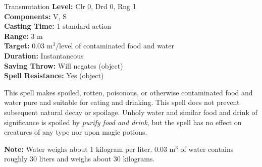 {Transmutation}
{
	\textbf{Level:}
	Clr 0, Drd 0, Rng 1\\
	\textbf{Components:}
	V, S\\
	\textbf{Casting Time:}
	1 standard action\\
	\textbf{Range:}
	3 m\\
	\textbf{Target:}
	0.03 m$^3$/level of contaminated food and water\\
	\textbf{Duration:}
	Instantaneous\\
	\textbf{Saving Throw:}
	Will negates (object)\\
	\textbf{Spell Resistance:}
	Yes (object)\\
}
{
	This spell makes spoiled, rotten, poisonous, or otherwise contaminated food and water pure and suitable for eating and drinking. This spell does not prevent subsequent natural decay or spoilage. Unholy water and similar food and drink of significance is spoiled by \emph{purify food and drink}, but the spell has no effect on creatures of any type nor upon magic potions.

	\textbf{Note:} Water weighs about 1 kilogram per liter. 0.03 m$^3$ of water contains roughly 30 liters and weighs about 30 kilograms.

}

